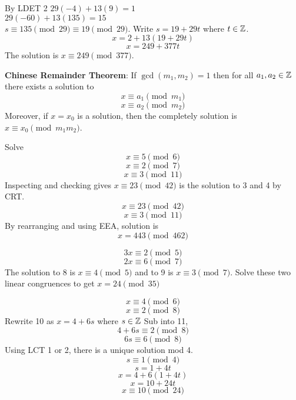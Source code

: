 \documentclass[english, 12pt]{article}
\begin{document}
By LDET 2
$29(-4) + 13(9) = 1$\\
$29(-60) + 13(135) = 15$\\
 $s \equiv 135 \pmod{29} \equiv 19 \pmod{29}$.
Write $s = 19 + 29t$ where $t \in {\mathbb{Z}}$.
\[ x = 2 + 13 (19 + 29t) \]
\[x =249 + 377t \]
The solution is $ x \equiv 249 \pmod{377}$.
\begin{thrm}[CRT]
\textbf{Chinese Remainder Theorem}: If $\gcd(m_{1}, m_{2}) = 1$ then for all $a_{1},a_{2} \in {\mathbb{Z}}$ there exists a solution to
\[x \equiv a_{1} \pmod{m_{1}} \]
\[x \equiv a_{2} \pmod{m_{2}} \]
Moreover, if $x = x_{0}$ is a solution, then the completely solution is $x \equiv x_{0} \pmod{m_{1} m_{2}}$.
\end{thrm}
\begin{exmp}
Solve 
\begin{equation}
x \equiv 5 \pmod 6 
\end{equation}
\begin{equation}
x \equiv 2 \pmod 7 
\end{equation}
\begin{equation}
 x \equiv 3 \pmod {11}
 \end{equation}
Inspecting and checking gives $x \equiv 23 \pmod {42}$ is the solution to 3 and 4 by CRT.
\begin{equation}
x \equiv 23 \pmod {42}
\end{equation}
\begin{equation}
 x \equiv 3 \pmod {11}
 \end{equation}
By rearranging and using EEA, solution is
 \[x = 443 \pmod {462} \]
\end{exmp}
\begin{exmp}
\begin{equation}
3x \equiv 2 \pmod 5
\end{equation}
\begin{equation}
2x \equiv 6 \pmod 7
\end{equation}
The solution to 8 is $x \equiv 4 \pmod 5$ and to 9 is $x \equiv 3 \pmod 7$. Solve these two linear congruences to get $ x = 24 \pmod{35}$
\end{exmp}
\begin{exmp}
\begin{equation}
x \equiv 4 \pmod 6
\end{equation}
\begin{equation}
x \equiv 2 \pmod 8
\end{equation}
Rewrite 10 as $x = 4 + 6s$ where $s \in {\mathbb{Z}}$ Sub into 11, 
\[ 4 + 6s \equiv 2 \pmod 8\]
\[ 6s \equiv 6 \pmod 8 \]
Using LCT 1 or 2, there is a unique solution mod 4.
\[s \equiv 1 \pmod 4 \]
\[s = 1 + 4t\]
\[x = 4 + 6(1 + 4t) \]
\[x = 10 + 24t \]
\[x \equiv 10 \pmod{24} \]
\end{exmp}
\end{document}
